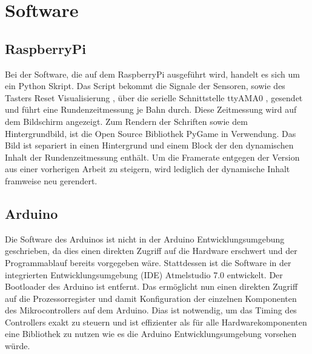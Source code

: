 \documentclass[a4paper, 11pt]{report}
\begin{document}
\chapter{Software}
	\section{RaspberryPi}\label{sec:SoftPi}
		Bei der Software, die auf dem RaspberryPi ausgeführt wird, handelt es sich um ein Python Skript.
		Das Script bekommt die Signale der Sensoren, sowie des Tasters \glqq Reset Visualisierung \grqq, über die serielle Schnittstelle \glqq ttyAMA0 \grqq, 
		gesendet und führt eine Rundenzeitmessung je Bahn durch.
		Diese Zeitmessung wird auf dem Bildschirm angezeigt.
		Zum Rendern der Schriften sowie dem Hintergrundbild, ist die Open Source Bibliothek \glqq PyGame\grqq{} in Verwendung.
		Das Bild ist separiert in einen Hintergrund und einem Block der den dynamischen Inhalt der Rundenzeitmessung enthält.
		Um die Framerate entgegen der Version aus einer vorherigen Arbeit zu steigern, wird lediglich der dynamische Inhalt framweise neu gerendert.
	\section{Arduino}
		Die Software des Arduinos ist nicht in der Arduino Entwicklungsumgebung geschrieben, da dies einen direkten Zugriff auf die Hardware erschwert und der Programmablauf bereits vorgegeben wäre.
		Stattdessen ist die Software in der integrierten Entwicklungsumgebung (IDE) \glqq Atmelstudio 7.0\grqq{} entwickelt.
		Der Bootloader des Arduino ist entfernt.
		Das ermöglicht nun einen direkten Zugriff auf die Prozessorregister und damit Konfiguration der einzelnen Komponenten des Mikrocontrollers auf dem Arduino.
		Dias ist notwendig, um das Timing des Controllers exakt zu steuern und ist effizienter als für alle Hardwarekomponenten eine Bibliothek zu nutzen wie es die Arduino Entwicklungsumgebung vorsehen würde.
\newpage
\end{document}
